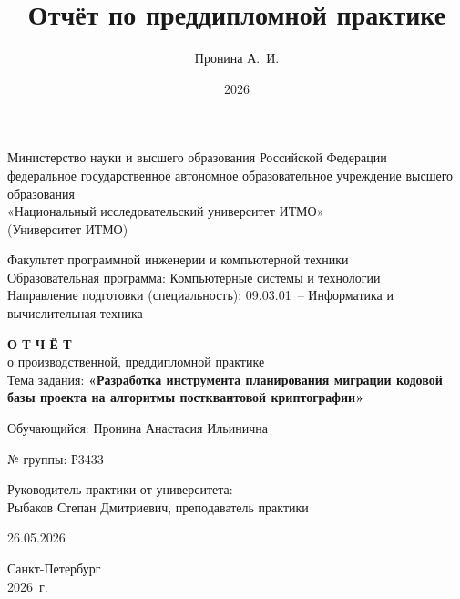 \documentclass{itmo-vkr}
\title{Отчёт по преддипломной практике}
\author{Пронина А.~И.}
\date{2026}
\begin{document}
\begin{titlepage}
\thispagestyle{empty}

\begin{center}
    Министерство науки и высшего образования Российской Федерации\\[0.3cm]
    федеральное государственное автономное образовательное учреждение высшего образования\\[0.3cm]
    «Национальный исследовательский университет ИТМО»\\[0.2cm]
    (Университет ИТМО)
\end{center}

\vspace{0.8cm}

\begin{center}
    Факультет программной инженерии и компьютерной техники\\[0.1cm]
    Образовательная программа: Компьютерные системы и технологии\\[0.1cm]
    Направление подготовки (специальность): 09.03.01~-- Информатика и вычислительная техника\\[0.1cm]
\end{center}

\vspace{1.2cm}

\begin{center}
    {\Large \textbf{О Т Ч Ё Т}}\\[0.6cm]
    о производственной, преддипломной практике\\[0.6cm]
    Тема задания: \textbf{«Разработка инструмента планирования миграции кодовой базы проекта на алгоритмы постквантовой криптографии»}
\end{center}

\vspace{1.5cm}

Обучающийся: Пронина Анастасия Ильинична

№ группы: Р3433

\noindent\hspace{1.2cm}\begin{minipage}[t]{\dimexpr\textwidth-1.5cm}
    Руководитель практики от университета:\\
    Рыбаков Степан Дмитриевич, преподаватель практики
\end{minipage}

\hfill 26.05.2026

\vfill

\begin{center}
    Санкт-Петербург\\
    2026~г.
\end{center}

\end{titlepage}
\end{document}
